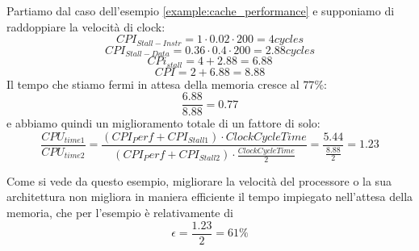 \begin{example}
	Partiamo dal caso dell'esempio \ref{example:cache_performance} e supponiamo di raddoppiare la velocità di clock:
	\[CPI_{Stall-Instr} = 1 \cdot 0.02 \cdot 200 = 4 cycles\]
	\[CPI_{Stall-Data} = 0.36 \cdot 0.4 \cdot 200 = 2.88 cycles\]
	\[CPi_{stall} = 4 + 2.88 = 6.88\]
	\[CPI = 2+6.88 = 8.88\]
	Il tempo che stiamo fermi in attesa della memoria cresce al $77\%$:
	\begin{equation*}
		\frac{6.88}{8.88}=0.77
	\end{equation*}
	e abbiamo quindi un miglioramento totale di un fattore di solo:
	\begin{equation*}
		\frac{CPU_{time1}}{CPU_{time2}} = \frac{(CPI_Perf + CPI_{Stall1}) \cdot ClockCycleTime}{(CPI_Perf + CPI_{Stall2}) \cdot \frac{ClockCycleTime}{2}} = \frac{5.44}{\frac{8.88}{2}} = 1.23
	\end{equation*}
\end{example}
Come si vede da questo esempio, migliorare la velocità del processore o la sua architettura non migliora in maniera efficiente il tempo impiegato nell'attesa della memoria, che per l'esempio è relativamente di
\begin{equation*}
	\epsilon = \frac{1.23}{2}=61\%
\end{equation*}
